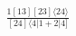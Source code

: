 \documentclass[varwidth, border=5pt]{standalone}
\begin{document}
\begin{my}
$\begin{gathered}
\scriptscriptstyle\frac{1[13][23]⟨24⟩}{[24]⟨4|1+2|4]}
\end{gathered}$
\end{my}
\end{document}
